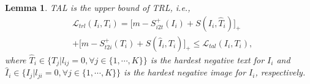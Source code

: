 \documentclass[10pt,twocolumn,letterpaper]{article}
\newtheorem{lemma}{Lemma}
\begin{document}
\begin{lemma}
    TAL is the upper bound of TRL, i.e.,
    \begin{equation}
    \begin{aligned}
        &\mathcal{L}_{trl}(I_i,T_i)= \big[ m -  S^+_{i2t}(I_i) +  S(I_i,\hat{T}_i)  \big]_+    \\
&+\big[ m -  S^+_{t2i}(T_i)  + S(\hat{I}_i,T_i) \big]_+ \leq \mathcal{L}_{tal}(I_i,T_i),
    \end{aligned}
    \end{equation}
    where $\hat{T}_i\in\{ T_j|l_{ij}=0, \forall j\in \{1,\cdots,K\} \}$ is the hardest negative text for $I_i$ and $\hat{I}_i\in\{ I_j|l_{ji}=0, \forall j\in \{1,\cdots,K\} \}$ is the hardest negative image for $I_i$, respectively. 
    \label{lam1}
\end{lemma}
\end{document}
